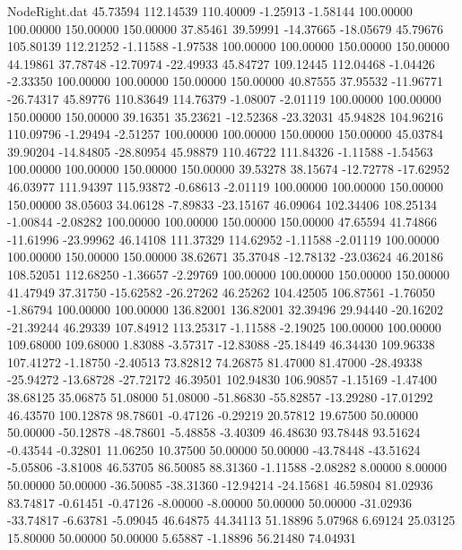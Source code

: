 \begin{filecontents}{NodeRight.dat}
  45.73594  112.14539  110.40009    -1.25913   -1.58144  100.00000  100.00000  150.00000  150.00000   37.85461   39.59991  -14.37665  -18.05679
  45.79676  105.80139  112.21252    -1.11588   -1.97538  100.00000  100.00000  150.00000  150.00000   44.19861   37.78748  -12.70974  -22.49933
  45.84727  109.12445  112.04468    -1.04426   -2.33350  100.00000  100.00000  150.00000  150.00000   40.87555   37.95532  -11.96771  -26.74317
  45.89776  110.83649  114.76379    -1.08007   -2.01119  100.00000  100.00000  150.00000  150.00000   39.16351   35.23621  -12.52368  -23.32031
  45.94828  104.96216  110.09796    -1.29494   -2.51257  100.00000  100.00000  150.00000  150.00000   45.03784   39.90204  -14.84805  -28.80954
  45.98879  110.46722  111.84326    -1.11588   -1.54563  100.00000  100.00000  150.00000  150.00000   39.53278   38.15674  -12.72778  -17.62952
  46.03977  111.94397  115.93872    -0.68613   -2.01119  100.00000  100.00000  150.00000  150.00000   38.05603   34.06128   -7.89833  -23.15167
  46.09064  102.34406  108.25134    -1.00844   -2.08282  100.00000  100.00000  150.00000  150.00000   47.65594   41.74866  -11.61996  -23.99962
  46.14108  111.37329  114.62952    -1.11588   -2.01119  100.00000  100.00000  150.00000  150.00000   38.62671   35.37048  -12.78132  -23.03624
  46.20186  108.52051  112.68250    -1.36657   -2.29769  100.00000  100.00000  150.00000  150.00000   41.47949   37.31750  -15.62582  -26.27262
  46.25262  104.42505  106.87561    -1.76050   -1.86794  100.00000  100.00000  136.82001  136.82001   32.39496   29.94440  -20.16202  -21.39244
  46.29339  107.84912  113.25317    -1.11588   -2.19025  100.00000  100.00000  109.68000  109.68000    1.83088   -3.57317  -12.83088  -25.18449
  46.34430  109.96338  107.41272    -1.18750   -2.40513   73.82812   74.26875   81.47000   81.47000  -28.49338  -25.94272  -13.68728  -27.72172
  46.39501  102.94830  106.90857    -1.15169   -1.47400   38.68125   35.06875   51.08000   51.08000  -51.86830  -55.82857  -13.29280  -17.01292
  46.43570  100.12878   98.78601    -0.47126   -0.29219   20.57812   19.67500   50.00000   50.00000  -50.12878  -48.78601   -5.48858   -3.40309
  46.48630   93.78448   93.51624    -0.43544   -0.32801   11.06250   10.37500   50.00000   50.00000  -43.78448  -43.51624   -5.05806   -3.81008
  46.53705   86.50085   88.31360    -1.11588   -2.08282    8.00000    8.00000   50.00000   50.00000  -36.50085  -38.31360  -12.94214  -24.15681
  46.59804   81.02936   83.74817    -0.61451   -0.47126   -8.00000   -8.00000   50.00000   50.00000  -31.02936  -33.74817   -6.63781   -5.09045
  46.64875   44.34113   51.18896     5.07968    6.69124   25.03125   15.80000   50.00000   50.00000    5.65887   -1.18896   56.21480   74.04931

\end{filecontents}
